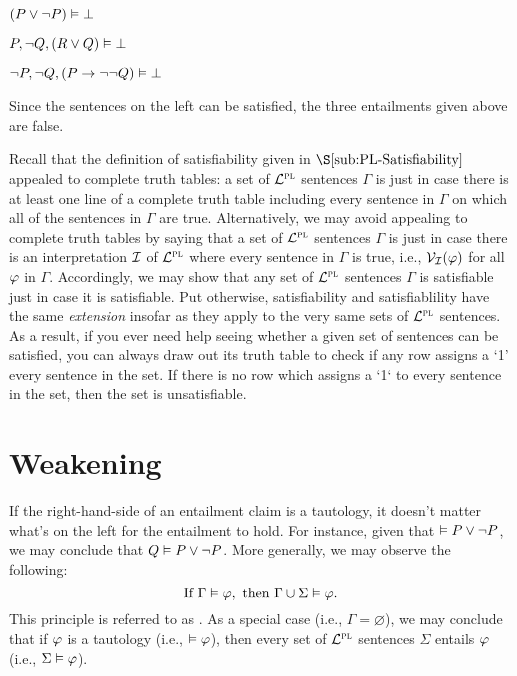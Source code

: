 \begin{earg}
\item[] $(P \vee \neg P) \vDash\bot$
\item[] $P, \neg Q, (R \vee Q) \vDash\bot$
\item[] $\neg P, \neg Q, (P \rightarrow \neg\neg Q) \vDash\bot$
\end{earg}

Since the sentences on the left can be satisfied, the three entailments given above are false.


Recall that the definition of satisfiability given in $\S\ref{sub:PL-Satisfiability}$ appealed to complete truth tables: a set of $\mathcal{L}^{\textsc{pl}}$ sentences $\Gamma$ is  just in case there is at least one line of a complete truth table including every sentence in $\Gamma$ on which all of the sentences in $\Gamma$ are true.
Alternatively, we may avoid appealing to complete truth tables by saying that a set of $\mathcal{L}^{\textsc{pl}}$ sentences $\Gamma$ is  just in case there is an interpretation $\mathcal{I}$ of $\mathcal{L}^{\textsc{pl}}$ where every sentence in $\Gamma$ is true, i.e., $\mathcal{V}_{\mathcal{I}}(\varphi)$ for all $\varphi$ in $\Gamma$.\label{def.PL-satisfiability}
Accordingly, we may show that any set of $\mathcal{L}^{\textsc{pl}}$ sentences $\Gamma$ is satisfiable just in case it is satisfiable. 
Put otherwise, satisfiability and satisfiablility have the same \textit{extension} insofar as they apply to the very same sets of $\mathcal{L}^{\textsc{pl}}$ sentences.
As a result, if you ever need help seeing whether a given set of sentences can be satisfied, you can always draw out its truth table to check if any row assigns a `1' every sentence in the set.
If there is no row which assigns a `1` to every sentence in the set, then the set is unsatisfiable.






\section{Weakening}

If the right-hand-side of an entailment claim is a tautology, it doesn't matter what's on the left for the entailment to hold.
For instance, given that $\vDash P \vee \neg P$, we may conclude that $Q \vDash P \vee \neg P$.
More generally, we may observe the following:
$$\text{If}~ \Gamma \vDash \varphi, ~\text{then}~ \Gamma \cup \Sigma\vDash \varphi.$$
This principle is referred to as .
As a special case (i.e., $\Gamma=\varnothing$), we may conclude that if $\varphi$ is a tautology (i.e., $\vDash \varphi$), then every set of $\mathcal{L}^{\textsc{pl}}$ sentences $\Sigma$ entails $\varphi$ (i.e., $\Sigma \vDash \varphi$).

